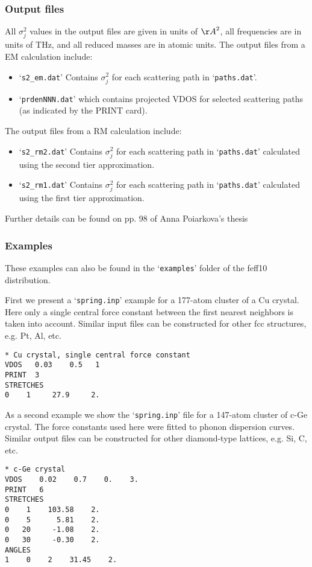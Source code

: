 \documentclass[11pt,oneside]{report} %
\renewcommand{\htmlref}[2]{\hyperlink{#2}{#1}}
\newcommand{\file}[1]{`\texttt{#1}'}
\renewcommand{\htmlref}[2]{{#1}} %
\begin{document}
\subsubsection{Output files}
All $\sigma_j^2$ values in the output files are given in units of ${\AA}^2$, all frequencies are in units of THz, and all reduced masses are in atomic units.
The output files from a EM calculation include:
\begin{itemize}
\item \file{s2\_em.dat}  Contains $\sigma_j^2$ for each scattering path in \file{paths.dat}. 
\item \file{prdenNNN.dat} which contains projected VDOS for selected scattering paths (as indicated by the PRINT card).
\end{itemize}

The output files from a RM calculation include:
\begin{itemize}
\item \file{s2\_rm2.dat}  Contains $\sigma_j^2$ for each scattering path in \file{paths.dat} calculated using the second tier approximation.
\item \file{s2\_rm1.dat}  Contains $\sigma_j^2$ for each scattering path in \file{paths.dat} calculated using the first tier approximation.
\end{itemize}

Further details can be found on pp. 98 of  \htmlref{Anna Poiarkova's thesis}{http://leonardo.phys.washington.edu/feff/papers/dissertations/thesis_poiarkova.ps}

\subsubsection{Examples}

These examples can also be found in the \file{examples} folder of the feff10 distribution.

First we present a \file{spring.inp} example for a 177-atom cluster of a Cu crystal.  Here only a single central force constant between the first nearest neighbors is taken into account.  Similar input files can be constructed for other fcc structures, e.g. Pt, Al, etc.
\begin{verbatim}
* Cu crystal, single central force constant
VDOS   0.03    0.5   1
PRINT  3
STRETCHES
0    1     27.9     2.
\end{verbatim}


As a second example we show the \file{spring.inp} file for a 147-atom cluster of c-Ge crystal.  The force constants used here were fitted to phonon dispersion curves.  Similar output files can be constructed for other diamond-type lattices, e.g. Si, C, etc.
\begin{verbatim}
* c-Ge crystal
VDOS    0.02    0.7    0.    3.
PRINT   6
STRETCHES
0    1    103.58    2.
0    5      5.81    2.
0   20     -1.08    2.
0   30     -0.30    2.
ANGLES
1    0    2    31.45    2.
\end{verbatim}
\end{document}
